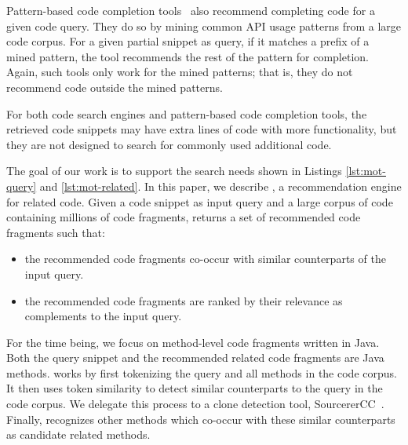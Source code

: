 Pattern-based code completion tools~\cite{nguyen2009groum,
  nguyen2012grapacc} also recommend completing code for a given code
query. They do so by mining common API usage patterns from a large
code corpus. For a given partial snippet as query, if it matches a
prefix of a mined pattern, the tool recommends the rest of the pattern
for completion. Again, such tools only work for the mined patterns;
that is, they do not recommend code outside the mined patterns.

For both code search engines and pattern-based code completion tools,
the retrieved code snippets may have extra lines of code with more
functionality, but they are not designed to search for commonly used
additional code.

The goal of our work is to support the search needs shown in Listings
\ref{lst:mot-query} and \ref{lst:mot-related}. In this paper, we
describe {\tool}, a recommendation engine for related code. Given a
code snippet as input query and a large corpus of code containing
millions of code fragments, {\tool} returns a set of recommended code
fragments such that:
\begin{itemize}
	\item the recommended code fragments co-occur with similar counterparts of the input query.
	\item the recommended code fragments are ranked by their
          relevance as complements to the input query.
\end{itemize}


For the time being, we focus on method-level code fragments written in
Java. Both the query snippet and the recommended related code
fragments are Java methods. {\tool} works by first tokenizing the
query and all methods in the code corpus. It then uses token
similarity to detect similar counterparts to the query in the code
corpus. We delegate this process to a clone detection tool,
SourcererCC~\cite{sajnani2016sourcerercc}. Finally, {\tool} recognizes
other methods which co-occur with these similar counterparts as
candidate related methods.

